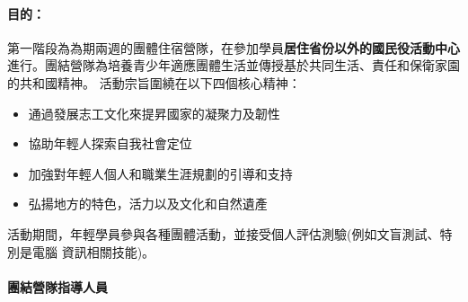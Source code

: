 \documentclass[a4paper,14pt]{extarticle}
\theoremstyle{plain}
\theoremstyle{remark}
\numberwithin{equation}{section}
\begin{document}
\paragraph{目的：}



\par
第一階段為為期兩週的團體住宿營隊，在參加學員\textbf{居住省份以外的國民役活動中心}進行。團結營隊為培養青少年適應團體生活並傳授基於共同生活、責任和保衛家園的共和國精神。
活動宗旨圍繞在以下四個核心精神：


\begin{itemize}
    \item 通過發展志工文化來提昇國家的凝聚力及韌性
    \item 協助年輕人探索自我社會定位 %
    \item 加強對年輕人個人和職業生涯規劃的引導和支持 
    \item 弘揚地方的特色，活力以及文化和自然遺產
	   
\end{itemize}

活動期間，年輕學員參與各種團體活動，並接受個人評估測驗(例如文盲測試、特別是電腦 資訊相關技能)。


\paragraph{團結營隊指導人員}
\end{document}
